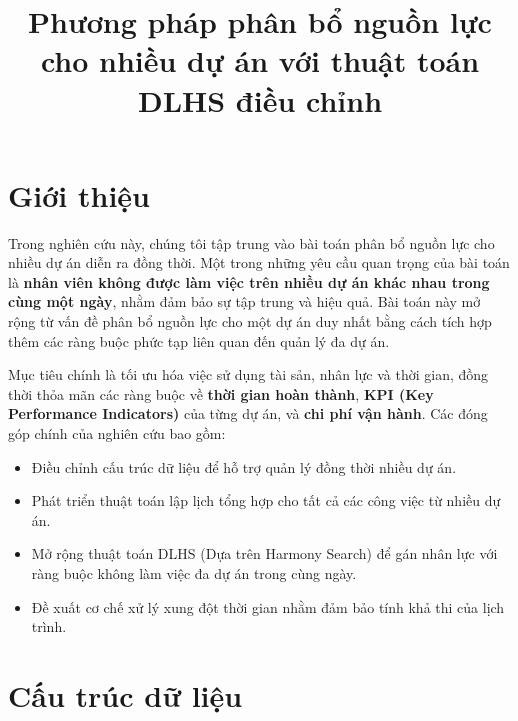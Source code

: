 \documentclass[a4paper,12pt]{article}
\title{Phương pháp phân bổ nguồn lực cho nhiều dự án với thuật toán DLHS điều chỉnh}
\author{}
\date{}
\begin{document}
\maketitle

\section{Giới thiệu}

Trong nghiên cứu này, chúng tôi tập trung vào bài toán phân bổ nguồn lực cho nhiều dự án diễn ra đồng thời. Một trong những yêu cầu quan trọng của bài toán là \textbf{nhân viên không được làm việc trên nhiều dự án khác nhau trong cùng một ngày}, nhằm đảm bảo sự tập trung và hiệu quả. Bài toán này mở rộng từ vấn đề phân bổ nguồn lực cho một dự án duy nhất bằng cách tích hợp thêm các ràng buộc phức tạp liên quan đến quản lý đa dự án.

Mục tiêu chính là tối ưu hóa việc sử dụng tài sản, nhân lực và thời gian, đồng thời thỏa mãn các ràng buộc về \textbf{thời gian hoàn thành}, \textbf{KPI (Key Performance Indicators)} của từng dự án, và \textbf{chi phí vận hành}. Các đóng góp chính của nghiên cứu bao gồm:
\begin{itemize}
    \item Điều chỉnh cấu trúc dữ liệu để hỗ trợ quản lý đồng thời nhiều dự án.
    \item Phát triển thuật toán lập lịch tổng hợp cho tất cả các công việc từ nhiều dự án.
    \item Mở rộng thuật toán DLHS (Dựa trên Harmony Search) để gán nhân lực với ràng buộc không làm việc đa dự án trong cùng ngày.
    \item Đề xuất cơ chế xử lý xung đột thời gian nhằm đảm bảo tính khả thi của lịch trình.
\end{itemize}

\section{Cấu trúc dữ liệu}
\end{document}
